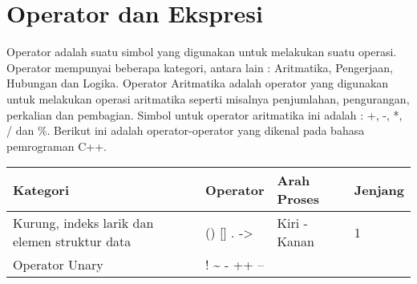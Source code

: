 \section{Operator dan Ekspresi}\label{operator-dan-ekspresi}

Operator adalah suatu simbol yang digunakan untuk melakukan suatu
operasi. Operator mempunyai beberapa kategori, antara lain : Aritmatika,
Pengerjaan, Hubungan dan Logika. Operator Aritmatika adalah operator
yang digunakan untuk melakukan operasi aritmatika seperti misalnya
penjumlahan, pengurangan, perkalian dan pembagian. Simbol untuk operator
aritmatika ini adalah : +, -, *, / dan \%. Berikut ini adalah
operator-operator yang dikenal pada bahasa pemrograman C++.

\begin{longtable}[]{@{}llll@{}}
\toprule
\begin{minipage}[b]{0.52\columnwidth}\raggedright\strut
Kategori
\strut\end{minipage} &
\begin{minipage}[b]{0.17\columnwidth}\raggedright\strut
Operator
\strut\end{minipage} &
\begin{minipage}[b]{0.14\columnwidth}\raggedright\strut
Arah Proses
\strut\end{minipage} &
\begin{minipage}[b]{0.05\columnwidth}\raggedright\strut
Jenjang
\strut\end{minipage}\tabularnewline
\midrule
\endhead
\begin{minipage}[t]{0.52\columnwidth}\raggedright\strut
Kurung, indeks larik dan elemen struktur data
\strut\end{minipage} &
\begin{minipage}[t]{0.17\columnwidth}\raggedright\strut
() {[}{]} . -\textgreater{}
\strut\end{minipage} &
\begin{minipage}[t]{0.14\columnwidth}\raggedright\strut
Kiri - Kanan
\strut\end{minipage} &
\begin{minipage}[t]{0.05\columnwidth}\raggedright\strut
1
\strut\end{minipage}\tabularnewline
\begin{minipage}[t]{0.52\columnwidth}\raggedright\strut
Operator Unary
\strut\end{minipage} &
\begin{minipage}[t]{0.17\columnwidth}\raggedright\strut
! \textasciitilde{} - ++ --
\strut\end{minipage} &

\end{longtable}
